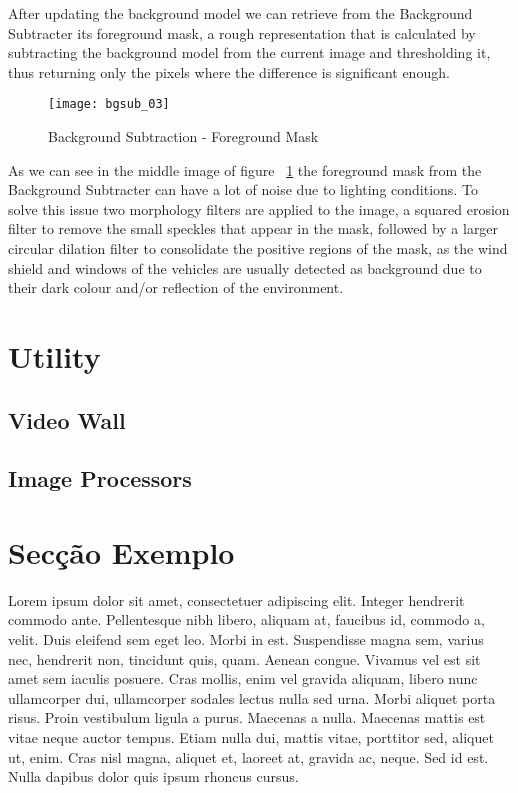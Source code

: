 After updating the background model we can retrieve from the Background Subtracter its foreground mask, a rough representation that is calculated by subtracting the background model from the current image and thresholding it, thus returning only the pixels where the difference is significant enough.

\begin{figure}[t]
  \begin{center}
    \leavevmode
    \texttt{[image: bgsub\_03]}
    \caption{Background Subtraction - Foreground Mask}
    \label{fig:bgsub_02}
  \end{center}
\end{figure}

As we can see in the middle image of figure ~\ref{fig:bgsub_02} the foreground mask from the Background Subtracter can have a lot of noise due to lighting conditions. To solve this issue two morphology filters are applied to the image, a squared erosion filter to remove the small speckles that appear in the mask, followed by a larger circular dilation filter to consolidate the positive regions of the mask, as the wind shield and windows of the vehicles are usually detected as background due to their dark colour and/or reflection of the environment.

\section{Utility}

\subsection{Video Wall}

\subsection{Image Processors}

\section{Secção Exemplo}


Lorem ipsum dolor sit amet, consectetuer adipiscing elit. Integer
hendrerit commodo ante. Pellentesque nibh libero, aliquam at, faucibus
id, commodo a, velit. 
Duis eleifend sem eget leo. Morbi in est. Suspendisse magna sem,
varius nec, hendrerit non, tincidunt quis, quam. Aenean congue. 
Vivamus vel est sit amet sem iaculis posuere. Cras mollis, enim vel
gravida aliquam, libero nunc ullamcorper dui, ullamcorper sodales
lectus nulla sed urna. Morbi aliquet porta risus. 
Proin vestibulum ligula a purus. Maecenas a nulla. 
Maecenas mattis est vitae neque auctor tempus. Etiam nulla dui,
mattis vitae, porttitor sed, aliquet ut, enim. Cras nisl magna,
aliquet et, laoreet at, gravida ac, neque. Sed id est. Nulla dapibus
dolor quis ipsum rhoncus cursus.

